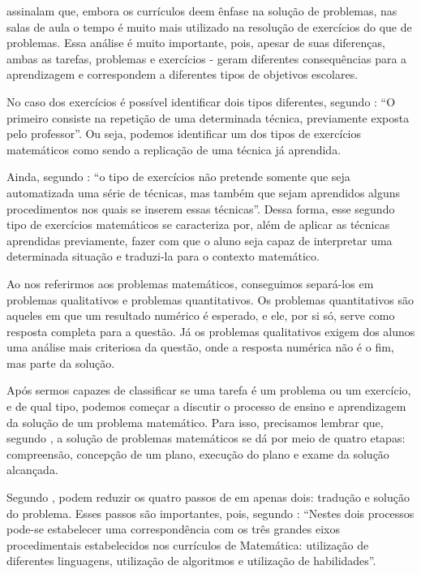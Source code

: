 assinalam que, embora os currículos deem ênfase na solução de problemas, nas salas de aula o tempo é muito mais utilizado na resolução de exercícios do que de problemas. Essa análise é muito importante, pois, apesar de suas diferenças, ambas as tarefas, problemas e exercícios - geram diferentes consequências para a aprendizagem e correspondem a diferentes tipos de objetivos escolares. 

No caso dos exercícios é possível identificar dois tipos diferentes, segundo : “O primeiro consiste na repetição de uma determinada técnica, previamente exposta pelo professor”. Ou seja, podemos identificar um dos tipos de exercícios matemáticos como sendo a replicação de uma técnica já aprendida. 

Ainda, segundo : “o tipo de exercícios não pretende somente que seja automatizada uma série de técnicas, mas também que sejam aprendidos alguns procedimentos nos quais se inserem essas técnicas”. Dessa forma, esse segundo tipo de exercícios matemáticos se caracteriza por, além de aplicar as técnicas aprendidas previamente, fazer com que o aluno seja capaz de interpretar uma determinada situação e traduzi-la para o contexto matemático. 

Ao nos referirmos aos problemas matemáticos, conseguimos separá-los em problemas qualitativos e problemas quantitativos. Os problemas quantitativos são aqueles em que um resultado numérico é esperado, e ele, por si só, serve como resposta completa para a questão. Já os problemas qualitativos exigem dos alunos uma análise mais criteriosa da questão, onde a resposta numérica não é o fim, mas parte da solução. 

Após sermos capazes de classificar se uma tarefa é um problema ou um exercício, e de qual tipo, podemos começar a discutir o processo de ensino e aprendizagem da solução de um problema matemático. Para isso, precisamos lembrar que, segundo , a solução de problemas matemáticos se dá por meio de quatro etapas: compreensão, concepção de um plano, execução do plano e exame da solução alcançada. 

Segundo , podem reduzir os quatro passos de  em apenas dois: tradução e solução do problema. Esses passos são importantes, pois, segundo : “Nestes dois processos pode-se estabelecer uma correspondência com os três grandes eixos procedimentais estabelecidos nos currículos de Matemática: utilização de diferentes linguagens, utilização de algoritmos e utilização de habilidades”. 

